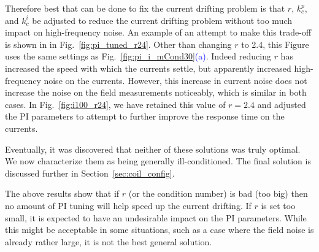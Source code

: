 Therefore best that can be done to fix the current drifting problem is that $r$, $k_c^p$, and $k_c^i$ be adjusted to reduce the current
drifting problem without too much impact on high-frequency noise.  An
example of an attempt to make this trade-off is shown in in
Fig.~\ref{fig:pi_tuned_r24}.  Other than changing $r$ to 2.4, this
Figure uses the same settings as
Fig.~\ref{fig:pi_i_mCond30}\textcolor{blue}{(a)}.  Indeed reducing $r$
has increased the speed with which the currents settle, but apparently increased high-frequency noise on the currents.
However, this increase in current noise does not increase
the noise on the field measurements noticeably, which is similar in both cases.
In Fig.~\ref{fig:i100_r24}, we have retained this value of $r=2.4$ and
adjusted the PI parameters to attempt to further improve the response
time on the currents.


Eventually, it was discovered that neither of these solutions was truly
optimal.  We now characterize them as being generally
ill-conditioned.  The final solution is discussed further in
Section~\ref{sec:coil_config}.

The above results show that if $r$ (or the condition number) is bad
(too big) then no amount of PI tuning will help speed up the current
drifting. If $r$ is set too small, it is expected to have an undesirable impact on the PI parameters. While this might be acceptable in some
situations, such as a case where the field noise is already rather large, it is
not the best general solution.
 




